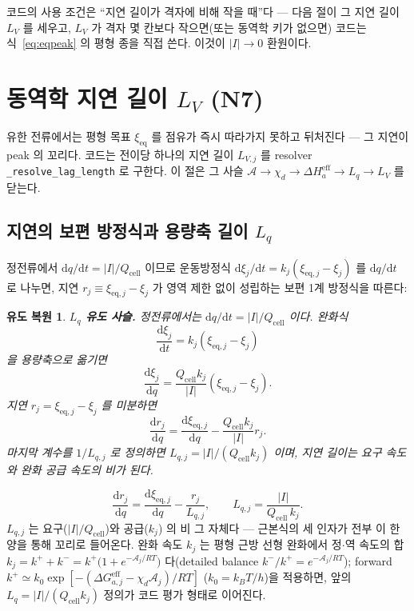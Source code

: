 \documentclass[11pt,a4paper]{article}
\newtheorem*{derivebox}{유도 복원}
\newcommand{\dd}{\mathrm{d}}
\newcommand{\eff}{\mathrm{eff}}
\newcommand{\eq}{\mathrm{eq}}
\newcommand{\cell}{\mathrm{cell}}
\newcommand{\code}[1]{\texttt{#1}}
\begin{document}
코드의 사용 조건은 ``지연 길이가 격자에 비해 작을 때''다 — 다음 절이 그 지연 길이 $L_V$ 를 세우고, $L_V$ 가 격자
몇 칸보다 작으면(또는 동역학 키가 없으면) 코드는 식~\eqref{eq:eqpeak} 의 평형 종을 직접 쓴다. 이것이 $|I|\to0$ 환원이다.

\section{동역학 지연 길이 $L_V$ (N7)}\label{sec:lag}
유한 전류에서는 평형 목표 $\xi_\eq$ 를 점유가 즉시 따라가지 못하고 뒤처진다 — 그 지연이 peak 의 꼬리다. 코드는 전이당
하나의 지연 길이 $L_{V,j}$ 를 resolver \code{\_resolve\_lag\_length} 로 구한다. 이 절은 그 사슬
$\mathcal A\to\chi_d\to\Delta H_a^\eff\to L_q\to L_V$ 를 닫는다.

\subsection{지연의 보편 방정식과 용량축 길이 $L_q$}
정전류에서 $\dd q/\dd t=|I|/Q_\cell$ 이므로 운동방정식 $\dd\xi_j/\dd t=k_j(\xi_{\eq,j}-\xi_j)$ 를 $\dd q/\dd t$ 로
나누면, 지연 $r_j\equiv\xi_{\eq,j}-\xi_j$ 가 영역 제한 없이 성립하는 보편 1계 방정식을 따른다:

\begin{derivebox}
\textbf{$L_q$ 유도 사슬.} 정전류에서는 $\dd q/\dd t=|I|/Q_{\cell}$ 이다. 완화식
\begin{equation*}
\frac{\dd\xi_j}{\dd t}=k_j(\xi_{\eq,j}-\xi_j)
\end{equation*}
을 용량축으로 옮기면
\begin{equation*}
\frac{\dd\xi_j}{\dd q}=\frac{Q_{\cell}k_j}{|I|}(\xi_{\eq,j}-\xi_j).
\end{equation*}
지연 $r_j=\xi_{\eq,j}-\xi_j$ 를 미분하면
\begin{equation*}
\frac{\dd r_j}{\dd q}=\frac{\dd\xi_{\eq,j}}{\dd q}-\frac{Q_{\cell}k_j}{|I|}r_j.
\end{equation*}
마지막 계수를 $1/L_{q,j}$ 로 정의하면 $L_{q,j}=|I|/(Q_{\cell}k_j)$ 이며, 지연 길이는 요구 속도와 완화 공급 속도의 비가 된다.
\end{derivebox}

\begin{equation}
\frac{\dd r_j}{\dd q}=\frac{\dd\xi_{\eq,j}}{\dd q}-\frac{r_j}{L_{q,j}},
\qquad L_{q,j}=\frac{|I|}{Q_\cell\,k_j}.
\label{eq:Lq}
\end{equation}
$L_{q,j}$ 는 요구($|I|/Q_\cell$)와 공급($k_j$) 의 비 그 자체다 — 근본식의 세 인자가 전부 이 한 양을 통해 꼬리로
들어온다. 완화 속도 $k_j$ 는 평형 근방 선형 완화에서 정$\cdot$역 속도의 합 $k_j=k^++k^-=k^+\big(1+e^{-\mathcal A_j/RT}\big)$ 다(detailed balance $k^-/k^+=e^{-\mathcal A_j/RT}$); forward $k^+\simeq k_0\exp[-(\Delta G_{a,j}^\eff-\chi_d\mathcal A_j)/RT]$
($k_0=k_BT/h$)을 적용하면, 앞의 $L_q=|I|/(Q_\cell k_j)$ 정의가 코드 평가 형태로 이어진다.
\end{document}
